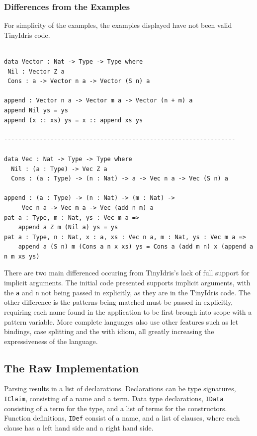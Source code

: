\documentclass[a4paper]{article}
\begin{document}
\subsubsection{Differences from the Examples}
\label{sec:orgb1c33be}

For simplicity of the examples, the examples displayed have not been 
valid TinyIdris code. 


\begin{center}
\begin{verbatim}

data Vector : Nat -> Type -> Type where
 Nil : Vector Z a
 Cons : a -> Vector n a -> Vector (S n) a

append : Vector n a -> Vector m a -> Vector (n + m) a
append Nil ys = ys
append (x :: xs) ys = x :: append xs ys

-----------------------------------------------------------------

data Vec : Nat -> Type -> Type where
  Nil : (a : Type) -> Vec Z a
  Cons : (a : Type) -> (n : Nat) -> a -> Vec n a -> Vec (S n) a

append : (a : Type) -> (n : Nat) -> (m : Nat) -> 
	 Vec n a -> Vec m a -> Vec (add n m) a
pat a : Type, m : Nat, ys : Vec m a =>
	append a Z m (Nil a) ys = ys
pat a : Type, n : Nat, x : a, xs : Vec n a, m : Nat, ys : Vec m a =>
	append a (S n) m (Cons a n x xs) ys = Cons a (add m n) x (append a n m xs ys)
\end{verbatim}
\end{center}

There are two main differenced occuring from TinyIdris's lack of full
support for implicit arguments. The initial code presented supports
implicit arguments, with the \texttt{a} and \texttt{n} not being passed in explicitly,
as they are in the TinyIdris code. The other difference is the patterns
being matched must be passed in explicitly, requiring each name found 
in the application to be first brough into scope with a pattern 
variable. More complete languages also use other features such as let 
bindings, case splitting and the with idiom, all greatly increasing the
expressiveness of the language.

\subsection{The Raw Implementation}
\label{sec:org98e062e}
Parsing results in a list of declarations. Declarations can be type 
signatures, \texttt{IClaim}, consisting of a name and a term. Data type 
declarations, \texttt{IData} consisting of a term for the type, and a list of
terms for the constructors. Function definitions, \texttt{IDef} consist of a
name, and a list of clauses, where each clause has a left hand side and
a right hand side. 
\end{document}
